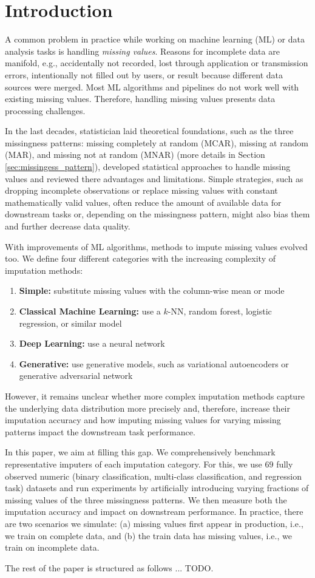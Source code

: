 \section{Introduction}
\label{sec:introduction}

A common problem in practice while working on machine learning (ML) or data analysis tasks is handling \emph{missing values}. Reasons for incomplete data are manifold, e.g., accidentally not recorded, lost through application or transmission errors, intentionally not filled out by users, or result because different data sources were merged. Most ML algorithms and pipelines do not work well with existing missing values. Therefore, handling missing values presents data processing challenges.

In the last decades, statistician laid theoretical foundations, such as the three missingness patterns: missing completely at random (MCAR), missing at random (MAR), and missing not at random (MNAR) (more details in Section \ref{sec:missingess_pattern}), developed statistical approaches to handle missing values and reviewed there advantages and limitations. Simple strategies, such as dropping incomplete observations or replace missing values with constant mathematically valid values, often reduce the amount of available data for downstream tasks or, depending on the missingness pattern, might also bias them and further decrease data quality.

With improvements of ML algorithms, methods to impute missing values evolved too. We define four different categories with the increasing complexity of imputation methods:
%
\begin{enumerate}
	\item \textbf{Simple:} substitute missing values with the column-wise mean or mode
	\item \textbf{Classical Machine Learning:} use a $k$-NN, random forest, logistic regression, or similar model
	\item \textbf{Deep Learning:} use a neural network
	\item \textbf{Generative:} use generative models, such as variational autoencoders or generative adversarial network
\end{enumerate}
%
However, it remains unclear whether more complex imputation methods capture the underlying data distribution more precisely and, therefore, increase their imputation accuracy and how imputing missing values for varying missing patterns impact the downstream task performance.

In this paper, we aim at filling this gap. We comprehensively benchmark representative imputers of each imputation category. For this, we use $69$ fully observed numeric (binary classification, multi-class classification, and regression task) datasets and run experiments by artificially introducing varying fractions of missing values of the three missingness patterns. We then measure both the imputation accuracy and impact on downstream performance. In practice, there are two scenarios we simulate: (a) missing values first appear in production, i.e., we train on complete data, and (b) the train data has missing values, i.e., we train on incomplete data.

The rest of the paper is structured as follows ... TODO.
